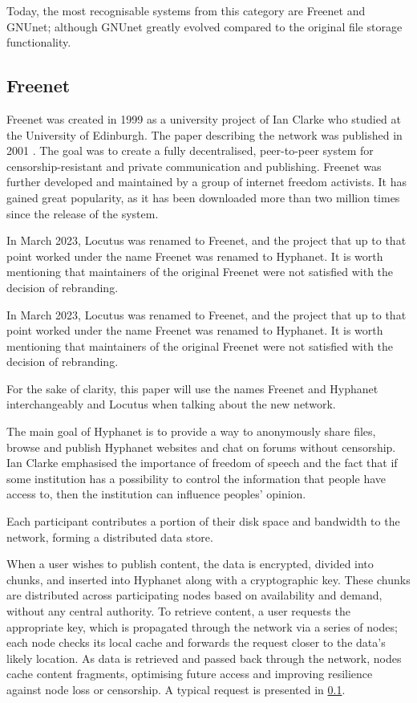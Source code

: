 Today, the most recognisable systems from this category are Freenet and GNUnet; although GNUnet greatly evolved compared to the original file storage functionality.

\subsection{Freenet}
Freenet was created in 1999 as a university project of Ian Clarke who studied at the University of Edinburgh. The paper describing the network was published in 2001 \cite{freenet}. The goal was to create a fully decentralised, peer-to-peer system for censorship-resistant and private communication and publishing. Freenet was further developed and maintained by a group of internet freedom activists. It has gained great popularity, as it has been downloaded more than two million times since the release of the system.

In March 2023, Locutus was renamed to Freenet, and the project that up to that point worked under the name Freenet was renamed to Hyphanet. It is worth mentioning that maintainers of the original Freenet were not satisfied with the decision of rebranding.

In March 2023, Locutus was renamed to Freenet, and the project that up to that point worked under the name Freenet was renamed to Hyphanet. It is worth mentioning that maintainers of the original Freenet were not satisfied with the decision of rebranding.

For the sake of clarity, this paper will use the names Freenet and Hyphanet interchangeably and Locutus when talking about the new network.

The main goal of Hyphanet is to provide a way to anonymously share files, browse and publish Hyphanet websites and chat on forums without censorship. Ian Clarke emphasised the importance of freedom of speech and the fact that if some institution has a possibility to control the information that people have access to, then the institution can influence peoples’ opinion.

Each participant contributes a portion of their disk space and bandwidth to the network, forming a distributed data store.

When a user wishes to publish content, the data is encrypted, divided into chunks, and inserted into Hyphanet along with a cryptographic key. These chunks are distributed across participating nodes based on availability and demand, without any central authority. To retrieve content, a user requests the appropriate key, which is propagated through the network via a series of nodes; each node checks its local cache and forwards the request closer to the data's likely location. As data is retrieved and passed back through the network, nodes cache  content fragments, optimising future access and improving resilience against node loss or censorship. A typical request is presented in \ref{}.

